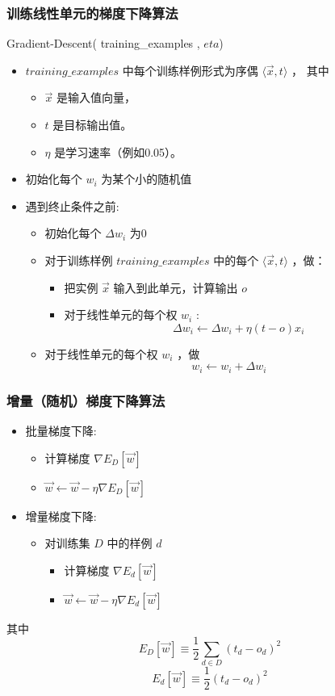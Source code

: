 \documentclass{beamer}
\begin{document}
\begin{frame}
\frametitle{训练线性单元的梯度下降算法}
\label{sec-2-9}


Gradient-Descent( training\_examples , $eta$)
\begin{itemize}
\item $training\_examples$ 中每个训练样例形式为序偶 $\langle \vec{x}, t \rangle$ ， 其中
\begin{itemize}
\item $\vec{x}$ 是输入值向量，
\item $t$ 是目标输出值。
\item $\eta$ 是学习速率（例如0.05）。
\end{itemize}
\item 初始化每个 $w_{i}$ 为某个小的随机值
\item 遇到终止条件之前:
\begin{itemize}
\item 初始化每个 $\Delta w_{i}$ 为0
\item 对于训练样例 $training\_examples$ 中的每个 $\langle \vec{x},t \rangle$ ，做：
\begin{itemize}
\item 把实例 $\vec{x}$ 输入到此单元，计算输出 $o$
\item 对于线性单元的每个权 $w_{i}$ :
            \[\Delta w_{i} \leftarrow \Delta w_{i} + \eta (t - o) x_{i}\]
\end{itemize}
\item 对于线性单元的每个权 $w_{i}$ ，做
            \[w_{i} \leftarrow w_{i} + \Delta w_{i}\]
\end{itemize}
\end{itemize}
\end{frame}
\begin{frame}
\frametitle{增量（随机）梯度下降算法}
\label{sec-2-10}


\begin{itemize}
\item 批量梯度下降:
\begin{itemize}
\item 计算梯度 $\nabla E_{D}[\vec{w}]$
\item $\vec{w} \leftarrow \vec{w} -\eta \nabla E_{D}[\vec{w}]$
\end{itemize}
\item 增量梯度下降:
\begin{itemize}
\item 对训练集 $D$ 中的样例 $d$
\begin{itemize}
\item 计算梯度 $\nabla E_{d}[\vec{w}]$
\item $\vec{w} \leftarrow \vec{w} -\eta \nabla E_{d}[\vec{w}]$
\end{itemize}
\end{itemize}
\end{itemize}

其中
         \[E_{D}[\vec{w}] \equiv  \frac{1}{2}\sum_{d \in D}(t_{d} - o_{d})^{2}\]
         \[E_{d}[\vec{w}] \equiv  \frac{1}{2}(t_{d} - o_{d})^{2}\]
\end{frame}
\end{document}
